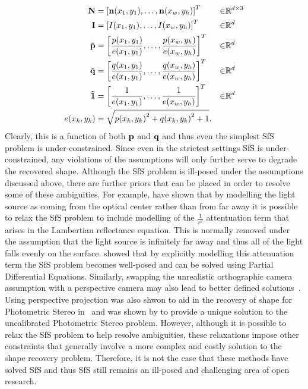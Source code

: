 \begin{align*}
    \boldsymbol{\mathbf{N}} &= {[\boldsymbol{\mathbf{n}}(x_1, y_1), \ldots, \boldsymbol{\mathbf{n}}(x_w, y_h)]}^T &\in &\mathbb{R}^{d \times 3} \\
	\boldsymbol{\mathbf{I}} &= {[I(x_1, y_1), \ldots, I(x_w, y_h)]}^T &\in &\mathbb{R}^{d} \\
	\boldsymbol{\mathbf{\tilde{p}}} &= {\left[\frac{p(x_1, y_1)}{e(x_1, y_1)}, \ldots, \frac{p(x_w, y_h)}{e(x_w, y_h)}\right]}^T &\in &\mathbb{R}^{d} \\
	\boldsymbol{\mathbf{\tilde{q}}} &= {\left[\frac{q(x_1, y_1)}{e(x_1, y_1)}, \ldots, \frac{q(x_w, y_h)}{e(x_w, y_h)}\right]}^T &\in &\mathbb{R}^{d} \\
 	\boldsymbol{\mathbf{\tilde{1}}} &= {\left[\frac{1}{e(x_1, y_1)}, \ldots, \frac{1}{e(x_w, y_h)}\right]}^T &\in &\mathbb{R}^{d} \\
	e(x_k, y_k) &= \sqrt{{p(x_k, y_k)}^2 + {q(x_k, y_k)}^2 + 1}. & &
\end{align*}
Clearly, this is a function of both $\boldsymbol{\mathbf{p}}$ and $\boldsymbol{\mathbf{q}}$ and thus even
the simplest SfS problem is under-constrained. Since
even in the strictest settings SfS is under-constrained, any violations
of the assumptions will only further serve to degrade the recovered shape.
Although the SfS problem is ill-posed under the assumptions discussed above,
there are further priors that can be placed in order to resolve some of these
ambiguities. For example, \citet{prados2005shape} have shown that by modelling
the light source as coming from the optical center rather than from far away
it is possible to relax the SfS problem to include modelling of the
$\frac{1}{r^2}$ attentuation term that arises in the Lambertian reflectance
equation. This is normally removed under the assumption that the light source
is infinitely far away and thus all of the light falls evenly on the surface.
\citet{prados2005shape} showed that by explicitly modelling this attenuation
term the SfS problem becomes well-posed and can be solved using Partial
Differential Equations. Similarly, swapping the unrealistic orthographic
camera assumption with a perspective camera may also lead to better defined
solutions~\citet{penna1989shape,breuss2012perspective}. Using perspective
projection was also shwon to aid in the recovery of shape for Photometric
Stereo in~\cite{tankus2005photometric} and was shown by
\citet{papadhimitri2013new} to provide a unique solution to the uncalibrated
Photometric Stereo problem. However, although it is
possible to relax the SfS problem to help resolve ambiguities, these relaxations
impose other constraints that generally involve a more complex and costly
solution to the shape recovery problem. Therefore, it is not the case that
these methods have solved SfS and thus SfS still remains an ill-posed and
challenging area of open research.

